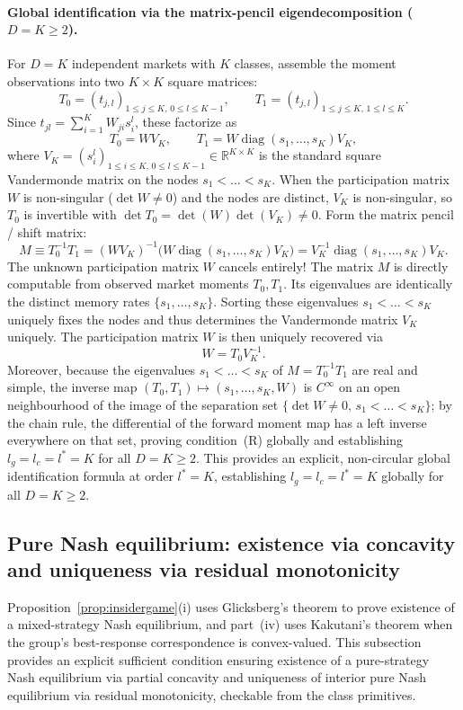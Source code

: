 \paragraph{Global identification via the matrix-pencil eigendecomposition ($D=K\ge2$).} For $D=K$ independent markets with $K$ classes, assemble the moment observations into two $K\times K$ square matrices:
\[
T_0 = (t_{j,l})_{1\le j\le K,\,0\le l\le K-1},\qquad T_1 = (t_{j,l})_{1\le j\le K,\,1\le l\le K}.
\]
Since $t_{jl}=\sum_{i=1}^K W_{ji}s_i^l$, these factorize as
\[
T_0 = W V_K,\qquad T_1 = W \operatorname{diag}(s_1,\dots,s_K) V_K,
\]
where $V_K=(s_i^l)_{1\le i\le K,\,0\le l\le K-1}\in\mathbb{R}^{K\times K}$ is the standard square Vandermonde matrix on the nodes $s_1<\dots<s_K$. When the participation matrix $W$ is non-singular ($\det W\ne0$) and the nodes are distinct, $V_K$ is non-singular, so $T_0$ is invertible with $\det T_0 = \det(W)\det(V_K)\ne0$. Form the matrix pencil / shift matrix:
\[
M \equiv T_0^{-1}T_1 = (W V_K)^{-1}\bigl(W \operatorname{diag}(s_1,\dots,s_K) V_K\bigr) = V_K^{-1}\operatorname{diag}(s_1,\dots,s_K) V_K.
\]
The unknown participation matrix $W$ cancels entirely! The matrix $M$ is directly computable from observed market moments $T_0, T_1$. Its eigenvalues are identically the distinct memory rates $\{s_1,\dots,s_K\}$. Sorting these eigenvalues $s_1<\dots<s_K$ uniquely fixes the nodes and thus determines the Vandermonde matrix $V_K$ uniquely. The participation matrix $W$ is then uniquely recovered via
\[
W = T_0 V_K^{-1}.
\]
Moreover, because the eigenvalues $s_1 < \dots < s_K$ of $M = T_0^{-1}T_1$ are real and simple, the inverse map $(T_0, T_1) \mapsto (s_1,\dots,s_K, W)$ is $C^\infty$ on an open neighbourhood of the image of the separation set $\{\det W \ne 0,\, s_1 < \dots < s_K\}$; by the chain rule, the differential of the forward moment map has a left inverse everywhere on that set, proving condition~(R) globally and establishing $l_g = l_c = l^* = K$ for all $D = K \ge 2$.
This provides an explicit, non-circular global identification formula at order $l^*=K$, establishing $l_g=l_c=l^*=K$ globally for all $D=K\ge2$.

\subsection{Pure Nash equilibrium: existence via concavity and uniqueness via residual monotonicity}\label{app:nashtight}

Proposition~\ref{prop:insidergame}(i) uses Glicksberg's theorem to prove existence of a mixed-strategy Nash equilibrium, and part~(iv) uses Kakutani's theorem when the group's best-response correspondence is convex-valued. This subsection provides an explicit sufficient condition ensuring existence of a pure-strategy Nash equilibrium via partial concavity and uniqueness of interior pure Nash equilibrium via residual monotonicity, checkable from the class primitives.

